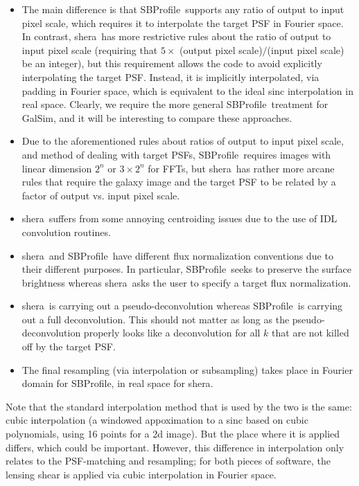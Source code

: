 \documentclass[preprint]{aastex}
\newcommand{\shera}{{\sc shera}}
\newcommand{\sbp}{SBProfile}
\begin{document}
\begin{itemize}
\item The main difference is that \sbp\ supports any ratio of output
  to input pixel scale, which requires it to interpolate the target
  PSF in Fourier space.  In contrast, \shera\ has more restrictive
  rules about the ratio of output to input pixel scale (requiring that
  $5\times$ (output pixel scale)$/$(input pixel scale) be an integer),
  but this requirement allows the code to avoid explicitly
  interpolating the target PSF.  Instead, it is implicitly
  interpolated, via padding in Fourier space, which is equivalent to
  the ideal sinc interpolation in real space.  Clearly, we require the
  more general \sbp\ treatment for GalSim, and it will be interesting
  to compare these approaches.
\item Due to the aforementioned rules about ratios of output to input
  pixel scale, and method of dealing with target PSFs, \sbp\ requires
  images with linear dimension $2^n$ or $3\times 2^n$ for FFTs, but \shera\ has rather
  more arcane rules that require the galaxy image and the target PSF
  to be related by a factor of output vs. input pixel scale.
\item \shera\ suffers from some annoying centroiding issues
  due to the use of IDL convolution routines.
\item \shera\ and \sbp\ have different flux normalization conventions
  due to their different purposes.  In particular, \sbp\ seeks to
  preserve the surface brightness whereas \shera\ asks the user to specify a target
  flux normalization.
\item \shera\ is carrying out a pseudo-deconvolution whereas \sbp\ is
  carrying out a full deconvolution.  This should not matter as long
  as the pseudo-deconvolution properly looks like a deconvolution for
  all $k$ that are not killed off by the target PSF.
\item The final resampling (via interpolation or subsampling) takes
  place in Fourier domain for \sbp, in real space for \shera.
\end{itemize}

Note that the standard interpolation method that is used by the two is
the same: cubic interpolation (a windowed
appoximation to a sinc based on cubic polynomials, using 16 points for
a 2d image).  But the place where it is applied differs, which could
be important.  However, this difference in interpolation only relates to the
PSF-matching and resampling;
for both pieces of software, the lensing shear is applied via cubic
interpolation in Fourier space.
\end{document}
